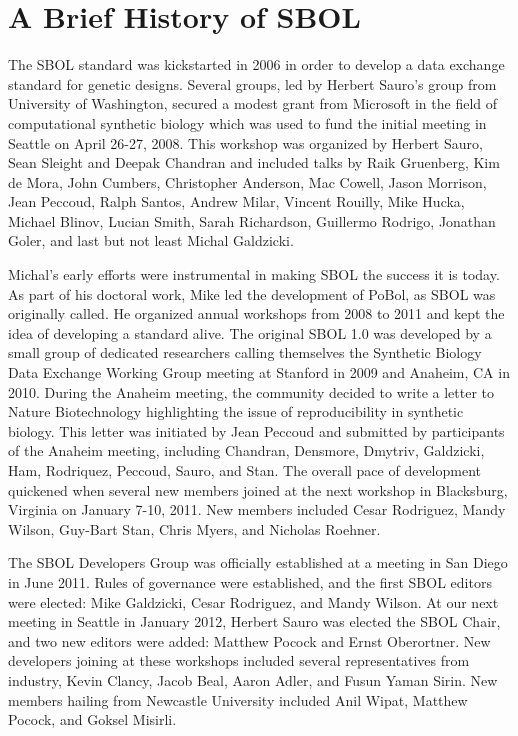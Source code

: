 \section{A Brief History of SBOL}

The SBOL standard was kickstarted in 2006 in order to develop a data exchange standard for genetic designs. Several groups, led by Herbert Sauro's group from University of Washington, secured a modest grant from Microsoft in the field of computational synthetic biology which was used to fund the initial meeting in Seattle on April 26-27, 2008. This workshop was organized by Herbert Sauro, Sean Sleight and Deepak Chandran and included talks by Raik Gruenberg, Kim de Mora, John Cumbers,  Christopher Anderson, Mac Cowell, Jason Morrison, Jean Peccoud, Ralph Santos, Andrew Milar, Vincent Rouilly, Mike Hucka, Michael Blinov, Lucian Smith, Sarah Richardson, Guillermo Rodrigo, Jonathan Goler, and last but not least Michal Galdzicki. 

Michal's early efforts were instrumental in making SBOL the success it is today. As part of his doctoral work, Mike led the development of PoBol, as SBOL was originally called.  He organized annual workshops from 2008 to 2011 and kept the idea of developing a standard alive. The original SBOL 1.0 was developed by a small group of dedicated researchers calling themselves the Synthetic Biology Data Exchange Working Group meeting at Stanford in 2009 and Anaheim, CA in 2010.  During the Anaheim meeting, the community decided to write a letter to Nature Biotechnology highlighting the issue of reproducibility in synthetic biology. This letter was  initiated by Jean Peccoud and submitted by participants of the Anaheim meeting, including Chandran, Densmore, Dmytriv, Galdzicki, Ham, Rodriquez, Peccoud, Sauro, and Stan. The overall pace of development quickened when several new members joined at the next workshop in Blacksburg, Virginia on January 7-10, 2011. New members included Cesar Rodriguez, Mandy Wilson, Guy-Bart Stan, Chris Myers, and Nicholas Roehner.

The SBOL Developers Group was officially established at a meeting in San Diego in June 2011.  Rules of governance were established, and the first SBOL editors were elected: Mike Galdzicki, Cesar Rodriguez, and Mandy Wilson. At our next meeting in Seattle in January 2012, Herbert Sauro was elected the SBOL Chair, and two new editors were added: Matthew Pocock and Ernst Oberortner.  New developers joining at these workshops included several representatives from industry, Kevin Clancy, Jacob Beal, Aaron Adler, and Fusun Yaman Sirin. New members hailing from Newcastle University included Anil Wipat, Matthew Pocock, and Goksel Misirli.

